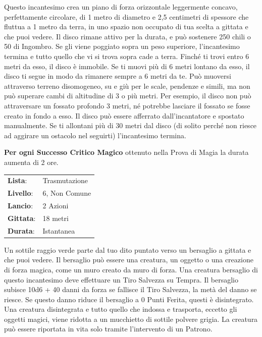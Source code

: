 \begin{multicols}{2}
Questo incantesimo crea un piano di forza orizzontale leggermente concavo, perfettamente circolare, di 1 metro di diametro e 2,5 centimetri di spessore che fluttua a 1 metro da terra, in uno spazio non occupato di tua scelta a gittata e che puoi vedere. Il disco rimane attivo per la durata, e può sostenere 250 chili o 50 di Ingombro. Se gli viene poggiato sopra un peso superiore, l'incantesimo termina e tutto quello che vi si trova sopra cade a terra. Finché ti trovi entro 6 metri da esso, il disco è immobile. Se ti muovi più di 6 metri lontano da esso, il disco ti segue in modo da rimanere sempre a 6 metri da te. Può muoversi attraverso terreno disomogeneo, su e giù per le scale, pendenze e simili, ma non può superare cambi di altitudine di 3 o più metri. Per esempio, il disco non può attraversare un fossato profondo 3 metri, né potrebbe lasciare il fossato se fosse creato in fondo a esso. Il disco può essere afferrato dall'incantatore e spostato manualmente. Se ti allontani più di 30 metri dal disco (di solito perché non riesce ad aggirare un ostacolo nel seguirti) l'incantesimo termina.

\textbf{Per ogni Successo Critico Magico} ottenuto nella Prova di Magia la durata aumenta di 2 ore.

\noindent\begin{tabularx}{\linewidth}{p{1.3cm}X}
	\rowcolor{gray!20}\textbf{Lista}: & Trasmutazione \\
	\textbf{Livello}: & 6, Non Comune \\
	\rowcolor{gray!20}\textbf{Lancio}: & 2 Azioni \\
	\textbf{Gittata}: & 18 metri \\
	\rowcolor{gray!20}\textbf{Durata}: & Istantanea \\
\end{tabularx}\smallskip

Un sottile raggio verde parte dal tuo dito puntato verso un bersaglio a gittata e che puoi vedere. Il bersaglio può essere una creatura, un oggetto o una creazione di forza magica, come un muro creato da muro di forza. Una creatura bersaglio di questo incantesimo deve effettuare un Tiro Salvezza su Tempra. Il bersaglio subisce 10d6 + 40 danni da forza se fallisce il Tiro Salvezza, la metà del danno se riesce. Se questo danno riduce il bersaglio a 0 Punti Ferita, questi è disintegrato. Una creatura disintegrata e tutto quello che indossa e trasporta, eccetto gli oggetti magici, viene ridotta a un mucchietto di sottile polvere grigia. La creatura può essere riportata in vita solo tramite l'intervento di un Patrono.


\end{multicols}
